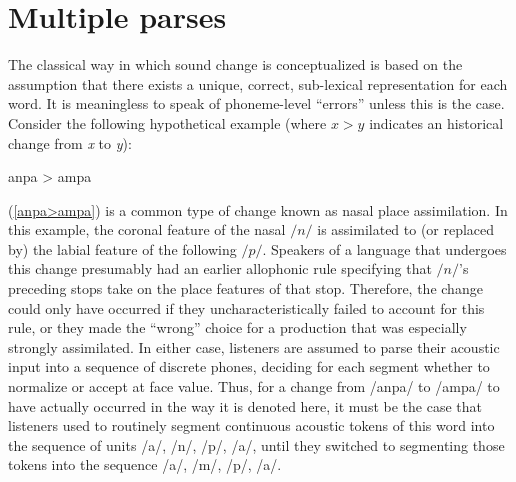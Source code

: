 \section{Multiple parses}

The classical way in which sound change is conceptualized is based
on the assumption that there exists a unique, correct, sub-lexical
representation for each word. It is meaningless to speak of phoneme-level
“errors” unless this is the case. Consider the following hypothetical
example (where \emph{$x>y$} indicates an historical change from \emph{x}
to \emph{y}):
\begin{covexamples}
\item \label{anpa>ampa}{anpa \textgreater{} ampa}
\end{covexamples}
(\ref{anpa>ampa}) is a common type of change known as nasal place
assimilation. In this example, the coronal feature of the nasal $/n/$
is assimilated to (or replaced by) the labial feature of the following
$/p/$. Speakers of a language that undergoes this change presumably
had an earlier allophonic rule specifying that $/n/$'s preceding
stops take on the place features of that stop. Therefore, the change
could only have occurred if they uncharacteristically failed to account
for this rule, or they made the “wrong” choice for a production
that was especially strongly assimilated. In either case, listeners
are assumed to parse their acoustic input into a sequence of discrete
phones, deciding for each segment whether to normalize or accept at
face value. Thus, for a change from {/anpa/} to {/ampa/}
to have actually occurred in the way it is denoted here, it must be
the case that listeners used to routinely segment continuous acoustic
tokens of this word into the sequence of units {/a/}, {/n/},
{/p/}, {/a/}, until they switched to segmenting
those tokens into the sequence {/a/}, {/m/}, {/p/},
{/a/}. 

